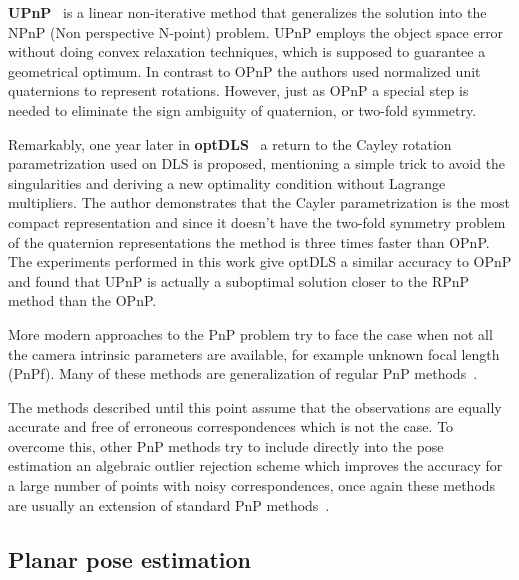 \documentclass[letterpaper, 10 pt, conference]{ieeeconf}  %
\begin{document}
\textbf{UPnP}~\cite{Kneip2014} is a linear non-iterative method that generalizes the solution into the NPnP (Non perspective N-point) problem. UPnP employs the object space error without doing convex relaxation techniques, which is supposed to guarantee a geometrical optimum. In contrast to OPnP the authors used normalized unit quaternions to represent rotations. However, just as OPnP a special step is needed to eliminate the sign ambiguity of quaternion, or two-fold symmetry. %

Remarkably, one year later in \textbf{optDLS}~\cite{Nakano2015} a return to the Cayley rotation parametrization used on DLS is proposed, mentioning a simple trick to avoid the singularities and deriving a new optimality condition without Lagrange multipliers. The author demonstrates that the Cayler parametrization is the most compact representation and since it doesn't have the two-fold symmetry problem of the quaternion representations the method is three times faster than OPnP. The experiments performed in this work give optDLS a similar accuracy to OPnP and found that UPnP is actually a suboptimal solution closer to the RPnP method than the OPnP. %

More modern approaches to the PnP problem try to face the case when not all the camera intrinsic parameters are available, for example unknown focal length (PnPf). Many of these methods are generalization of regular PnP methods~\cite{Zheng2014,Kanaeva2015,Changchang2015,Zheng2016}. 

The methods described until this point assume that the observations are equally accurate and free of erroneous correspondences which is not the case. To overcome this, other PnP methods try to include directly into the pose estimation an algebraic outlier rejection scheme which improves the accuracy for a large number of points with noisy correspondences, once again these methods are usually an extension of standard PnP methods~\cite{Ferraz2014b,Ferraz2014,Urban2016}.

\subsection{Planar pose estimation}

\end{document}
